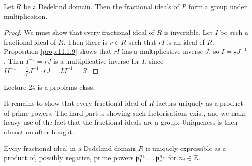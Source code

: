 \begin{theorem}
Let $ R $ be a Dedekind domain. Then the fractional ideals of $ R $ form a group under multiplication.
\end{theorem}

\begin{proof}
We must show that every fractional ideal of $ R $ is invertible. Let $ I $ be such a fractional ideal of $ R $. Then there is $ r \in R $ such that $ rI $ is an ideal of $ R $. Proposition \ref{prop:11.1.9} shows that $ rI $ has a multiplicative inverse $ J $, so $ I = \tfrac{1}{r}J^{-1} $. Then $ I^{-1} = rJ $ is a multiplicative inverse for $ I $, since $ II^{-1} = \tfrac{1}{r}J^{-1} \cdot rJ = JJ^{-1} = R $.
\end{proof}


Lecture 24 is a problems class.


It remains to show that every fractional ideal of $ R $ factors uniquely as a product of prime powers. The hard part is showing such factorisations exist, and we make heavy use of the fact that the fractional ideals are a group. Uniqueness is then almost an afterthought.

\pagebreak

\begin{proposition}
Every fractional ideal in a Dedekind domain $ R $ is uniquely expressible as a product of, possibly negative, prime powers $ \mathfrak{p}_1^{n_1} \dots \mathfrak{p}_s^{n_s} $ for $ n_i \in \mathbb{Z} $.
\end{proposition}

